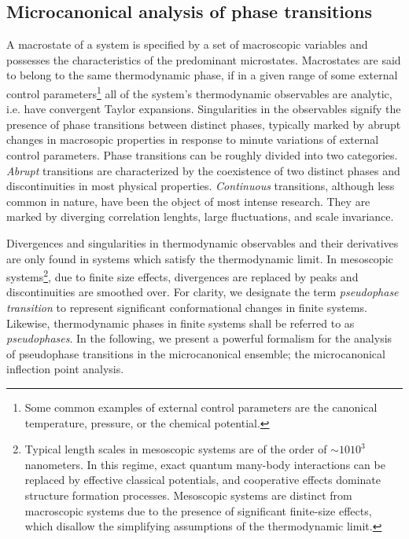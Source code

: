 \documentclass[12pt]{report}
\begin{document}
\subsection{Microcanonical analysis of phase transitions}
\label{subsec: micro_analysis}
A macrostate of a system is specified by a set of macroscopic variables and possesses the characteristics of the predominant microstates. Macrostates are said to belong to the same thermodynamic phase, if in a given range of some external control parameters\footnote{Some common examples of external control parameters are the canonical temperature, pressure, or the chemical potential.} all of the system's thermodynamic observables are analytic, i.e. have convergent Taylor expansions. Singularities in the observables signify the presence of phase transitions between distinct phases, typically marked by abrupt changes in macrosopic properties in response to minute variations of external control parameters. Phase transitions can be roughly divided into two categories. \textit{Abrupt} transitions are characterized by the coexistence of two distinct phases and discontinuities in most physical properties. \textit{Continuous} transitions, although less common in nature, have been the object of most intense research. They are marked by diverging correlation lenghts, large fluctuations, and scale invariance\cite{Sethna2006}. 

Divergences and singularities in thermodynamic observables and their derivatives are only found in systems which satisfy the thermodynamic limit. In mesoscopic systems\footnote{Typical length scales in  mesoscopic systems are of the order of $\sim 10  10^{3}$ nanometers. In this regime, exact quantum many-body interactions can be replaced by effective classical potentials, and cooperative effects dominate structure formation processes. Mesoscopic systems are distinct from macroscopic systems due to the presence of significant finite-size effects, which disallow the simplifying assumptions of the thermodynamic limit.}, due to finite size effects, divergences are replaced by peaks and discontinuities are smoothed over\cite{Bachmann2014}. For clarity, we designate the term \textit{pseudophase transition} to represent significant conformational changes in finite systems. Likewise, thermodynamic phases in finite systems shall be referred to as \textit{pseudophases}. In the following, we present a powerful formalism for the analysis of pseudophase transitions in the microcanonical ensemble; the microcanonical inflection point analysis.
\end{document}
